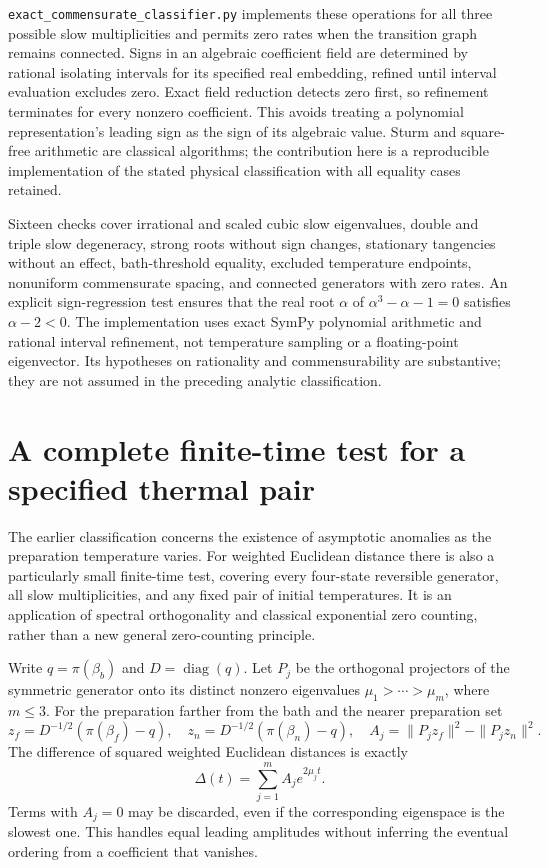 \documentclass[11pt]{article}
\begin{document}
\texttt{exact\_commensurate\_classifier.py} implements these operations for
all three possible slow multiplicities and permits zero rates when the
transition graph remains connected. Signs in an algebraic coefficient field
are determined by rational isolating intervals for its specified real
embedding, refined until interval evaluation excludes zero. Exact field
reduction detects zero first, so refinement terminates for every nonzero
coefficient. This avoids treating a polynomial representation's leading sign
as the sign of its algebraic value. Sturm and square-free arithmetic are
classical algorithms; the contribution here is a reproducible implementation
of the stated physical classification with all equality cases retained.

Sixteen checks cover irrational and scaled cubic slow eigenvalues, double and triple
slow degeneracy, strong roots without sign changes, stationary tangencies
without an effect, bath-threshold equality, excluded temperature endpoints,
nonuniform commensurate spacing, and connected generators with zero rates.
An explicit sign-regression test ensures that the real root $\alpha$ of
$\alpha^3-\alpha-1=0$ satisfies $\alpha-2<0$. The implementation uses exact
SymPy polynomial arithmetic and rational interval refinement, not temperature
sampling or a floating-point eigenvector. Its hypotheses on rationality and
commensurability are substantive; they are not assumed in the preceding
analytic classification.

\section{A complete finite-time test for a specified thermal pair}\label{sec:finitechi}
The earlier classification concerns the existence of asymptotic anomalies
as the preparation temperature varies. For weighted Euclidean distance there
is also a particularly small finite-time test, covering every four-state
reversible generator, all slow multiplicities, and any fixed pair of initial
temperatures. It is an application of spectral orthogonality and classical
exponential zero counting, rather than a new general zero-counting principle.

Write $q=\pi(\beta_b)$ and $D=\operatorname{diag}(q)$. Let $P_j$ be the orthogonal projectors of the symmetric generator onto its
distinct nonzero eigenvalues $\mu_1>\cdots>\mu_m$, where $m\leq3$.
For the preparation farther from the bath and the nearer preparation set
\[
z_f=D^{-1/2}(\pi(\beta_f)-q),\quad
z_n=D^{-1/2}(\pi(\beta_n)-q),\quad
A_j=\|P_jz_f\|^2-\|P_jz_n\|^2.
\]
The difference of squared weighted Euclidean distances is exactly
\[
\Delta(t)=\sum_{j=1}^m A_j e^{2\mu_jt}.
\]
Terms with $A_j=0$ may be discarded, even if the corresponding eigenspace
is the slowest one. This handles equal leading amplitudes without inferring
the eventual ordering from a coefficient that vanishes.
\end{document}
